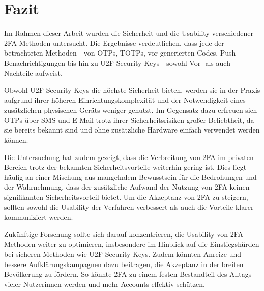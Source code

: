 \chapter{Fazit}

Im Rahmen dieser Arbeit wurden die Sicherheit und die Usability verschiedener \acl{2FA}-Methoden untersucht. Die Ergebnisse verdeutlichen, dass jede der betrachteten Methoden - von \acp{OTP}, \acp{TOTP}, vor-generierten Codes, Push-Benach\-richtigungen bis hin zu \ac{U2F}-Security-Keys - sowohl Vor- als auch Nachteile aufweist.

Obwohl \ac{U2F}-Security-Keys die höchste Sicherheit bieten, werden sie in der Praxis aufgrund ihrer höheren Einrichtungs­komplexität und der Notwendigkeit eines zusätzlichen physischen Geräts weniger genutzt. Im Gegensatz dazu erfreuen sich \acp{OTP} über SMS und E-Mail trotz ihrer Sicherheitsrisiken großer Beliebtheit, da sie bereits bekannt sind und ohne zusätzliche Hardware einfach verwendet werden können.

Die Untersuchung hat zudem gezeigt, dass die Verbreitung von \ac{2FA} im privaten Bereich trotz der bekannten Sicherheitsvorteile weiterhin gering ist. Dies liegt häufig an einer Mischung aus mangelndem Bewusstsein für die Bedrohungen und der Wahrnehmung, dass der zusätzliche Aufwand der Nutzung von \ac{2FA} keinen signifikanten Sicherheitsvorteil bietet. Um die Akzeptanz von \ac{2FA} zu steigern, sollten sowohl die Usability der Verfahren verbessert als auch die Vorteile klarer kommuniziert werden.

Zukünftige Forschung sollte sich darauf konzentrieren, die Usability von \ac{2FA}-Methoden weiter zu optimieren, insbesondere im Hinblick auf die Einstiegshürden bei sicheren Methoden wie \ac{U2F}-Security-Keys. Zudem könnten Anreize und bessere Aufklärungskampagnen dazu beitragen, die Akzeptanz in der breiten Bevölkerung zu fördern. So könnte \ac{2FA} zu einem festen Bestandteil des Alltags vieler Nutzerinnen werden und mehr Accounts effektiv schützen.
